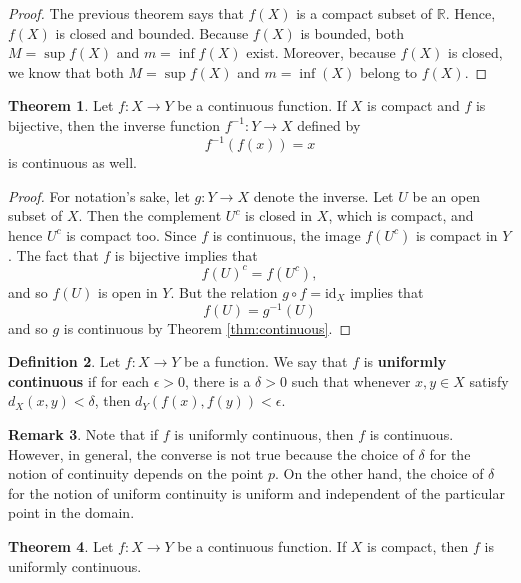 \documentclass[12pt]{article}
\theoremstyle{definition}
\newtheorem{definition}{Definition}
\newtheorem{remark}[definition]{Remark}
\theoremstyle{theorem}
\newtheorem{theorem}[definition]{Theorem}
\begin{document}
\begin{proof}
The previous theorem says that $f(X)$ is a compact subset of $\mathbb{R}$. Hence, $f(X)$ is closed and bounded. Because $f(X)$ is bounded, both $M = \sup f(X)$ and $m = \inf f(X)$ exist. Moreover, because $f(X)$ is closed, we know that both $M = \sup f(X)$ and $m = \inf(X)$ belong to $f(X)$. 
\end{proof}

\begin{theorem}
Let $f : X \to Y$ be a continuous function. If $X$ is compact and $f$ is bijective, then the inverse function $f^{-1} : Y \to X$ defined by 
\[
f^{-1}(f(x)) = x
\] 
is continuous as well. 
\end{theorem}

\begin{proof}
For notation's sake, let $g : Y \to X$ denote the inverse. Let $U$ be an open subset of $X$. Then the complement $U^c$ is closed in $X$, which is compact, and hence $U^c$ is compact too. Since $f$ is continuous, the image $f(U^c)$ is compact in $Y$. The fact that $f$ is bijective implies that   
\[
f(U)^c = f(U^c),
\]
and so $f(U)$ is open in $Y$. But the relation $g \circ f = \text{id}_X$ implies that  
\[
f(U) = g^{-1}(U)
\]
and so $g$ is continuous by Theorem \ref{thm:continuous}. 

\end{proof}



\begin{definition}
Let $f : X \to Y$ be a function. We say that $f$ is \textbf{uniformly continuous} if for each $\epsilon > 0$, there is a $\delta > 0$ such that whenever $x,y \in X$ satisfy $d_X(x,y) < \delta$, then $d_Y(f(x), f(y)) < \epsilon$. 
\end{definition}

\begin{remark}
Note that if $f$ is uniformly continuous, then $f$ is continuous. However, in general, the converse is not true because the choice of $\delta$ for the notion of continuity depends on the point $p$. On the other hand, the choice of $\delta$ for the notion of uniform continuity is uniform and independent of the particular point in the domain. 
\end{remark}

\begin{theorem}
Let $f : X \to Y$ be a continuous function. If $X$ is compact, then $f$ is uniformly continuous. 
\end{theorem}
\end{document}
